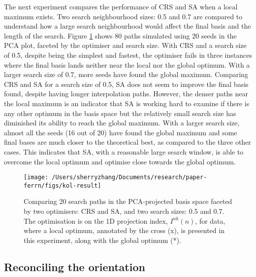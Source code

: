 The next experiment compares the performance of CRS and SA when a local
maximum exists. Two search neighbourhood sizes: 0.5 and 0.7 are compared
to understand how a large search neighbourhood would affect the final
basis and the length of the search. Figure \ref{fig:kol-result} shows 80
paths simulated using 20 seeds in the PCA plot, faceted by the optimiser
and search size. With CRS and a search size of 0.5, despite being the
simplest and fastest, the optimiser fails in three instances where the
final basis lands neither near the local nor the global optimum. With a
larger search size of 0.7, more seeds have found the global maximum.
Comparing CRS and SA for a search size of 0.5, SA does not seem to
improve the final basis found, despite having longer interpolation
paths. However, the denser paths near the local maximum is an indicator
that SA is working hard to examine if there is any other optimum in the
basis space but the relatively small search size has diminished its
ability to reach the global maximum. With a larger search size, almost
all the seeds (16 out of 20) have found the global maximum and some
final bases are much closer to the theoretical best, as compared to the
three other cases. This indicates that SA, with a reasonable large
search window, is able to overcome the local optimum and optimise close
towards the global optimum.

\begin{Schunk}
\begin{figure}

{\centering \texttt{[image: /Users/sherryzhang/Documents/research/paper-ferrn/figs/kol-result]} 

}

\caption[Comparing 20 search paths in the PCA-projected basis space faceted by two optimisers]{Comparing 20 search paths in the PCA-projected basis space faceted by two optimisers: CRS and SA, and two search sizes: 0.5 and 0.7. The optimisation is on the 1D projection index, $I^{nk}(n)$, for  data, where a local optimum, annotated by the cross (x), is presented in this experiment, along with the global optimum (*).}\label{fig:kol-result}
\end{figure}
\end{Schunk}

\hypertarget{reconciling-the-orientation}{%
\subsection{Reconciling the
orientation}\label{reconciling-the-orientation}}

